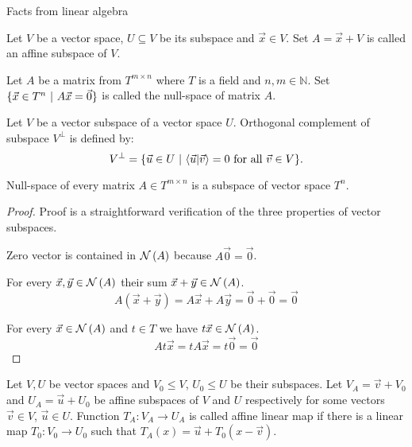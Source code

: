 \begin{chapter}{Facts from linear algebra}
\begin{definition}
Let $V$ be a vector space, $U \subseteq V$ be its subspace and $\vec{x} \in V$. Set $A = \vec{x} + V$ is called an affine subspace of $V$.
\end{definition}

\begin{definition}
Let $A$ be a matrix from $T ^ {m \times n}$ where $T$ is a field and $n, m \in \mathbb{N}$. Set $\{ \vec{x} \in T^{n} \ | \  A\vec{x} = \vec{0} \}$ is called the null-space of matrix $A$.
\end{definition}

\begin{definition}
Let $V$ be a vector subspace of a vector space $U$. Orthogonal complement of subspace $V ^ {\bot}$ is defined by:
\[
	V ^ {\bot} = \{ \vec{u} \in U \ | \  \langle \vec{u} | \vec{v} \rangle = 0 \text{ for all } \vec{v} \in V \} \text{.}
\]
\end{definition}

\begin{remark}
Null-space of every matrix $A \in T ^ {m \times n}$ is a subspace of vector space $T^{n}$.
\end{remark}
\begin{proof}
Proof is a straightforward verification of the three properties of vector subspaces.

Zero vector is contained in $\mathcal{N}\left({A}\right)$ because $A\vec{0} = \vec{0}$.

For every $\vec{x}, \vec{y} \in \mathcal{N}\left({A}\right)$ their sum $\vec{x} + \vec{y} \in \mathcal{N}\left({A}\right)$.
\[
	A(\vec{x} + \vec{y}) = A\vec{x} + A\vec{y} = \vec{0} + \vec{0} = \vec{0}
\]

For every $\vec{x} \in \mathcal{N}\left({A}\right)$ and $t \in T$ we have $t \vec{x} \in \mathcal{N}\left({A}\right)$.
\[
	At\vec{x} = tA\vec{x} = t\vec{0} = \vec{0}
\]
\end{proof}

\begin{definition}
Let $V, U$ be vector spaces and $V_0 \leq V$, $U_0 \leq U$ be their subspaces. Let $V_A = \vec{v} + V_0$ and $U_A = \vec{u} + U_0$ be affine subspaces of $V$ and $U$ respectively for some vectors $\vec{v} \in V$, $\vec{u} \in U$. Function $T_A: V_A \rightarrow U_A$ is called affine linear map if there is a linear map $T_0: V_0 \rightarrow U_0$ such that $T_A(x) = \vec{u} + T_0(x - \vec{v})$.
\end{definition}


\end{chapter}
